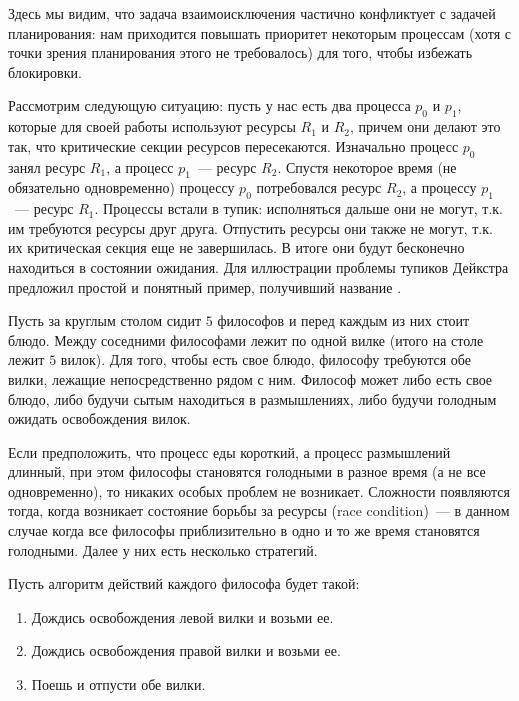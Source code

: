 Здесь мы видим, что задача взаимоисключения частично конфликтует с задачей
планирования: нам приходится повышать приоритет некоторым процессам (хотя с
точки зрения планирования этого не требовалось) для того, чтобы избежать
блокировки.


Рассмотрим следующую ситуацию: пусть у нас есть два процесса \(p_0\) и \(p_1\),
которые для своей работы используют ресурсы \(R_1\) и \(R_2\), причем они делают
это так, что критические секции ресурсов пересекаются. Изначально процесс
\(p_0\) занял ресурс \(R_1\), а процесс \(p_1\)~--- ресурс \(R_2\). Спустя
некоторое время (не обязательно одновременно) процессу \(p_0\) потребовался
ресурс \(R_2\), а процессу \(p_1\)~--- ресурс \(R_1\). Процессы встали в тупик:
исполняться дальше они не могут, т.к. им требуются ресурсы друг друга. Отпустить
ресурсы они также не могут, т.к. их критическая секция еще не завершилась. В
итоге они будут бесконечно находиться в состоянии ожидания. Для иллюстрации
проблемы тупиков Дейкстра предложил простой и понятный пример, получивший
название .

Пусть за круглым столом сидит \(5\) философов и перед каждым из них стоит блюдо.
Между соседними философами лежит по одной вилке (итого на столе лежит \(5\)
вилок). Для того, чтобы есть свое блюдо, философу требуются обе вилки, лежащие
непосредственно рядом с ним. Философ может либо есть свое блюдо, либо будучи
сытым находиться в размышлениях, либо будучи голодным ожидать освобождения
вилок.

Если предположить, что процесс еды короткий, а процесс размышлений длинный, при
этом философы становятся голодными в разное время (а не все одновременно), то
никаких особых проблем не возникает. Сложности появляются тогда, когда возникает
состояние борьбы за ресурсы (race condition)~--- в данном случае когда все
философы приблизительно в одно и то же время становятся голодными. Далее у них
есть несколько стратегий.


Пусть алгоритм действий каждого философа будет такой:

\begin{enumerate}
\item
  Дождись освобождения левой вилки и возьми ее.

\item
  Дождись освобождения правой вилки и возьми ее.

\item
  Поешь и отпусти обе вилки.
\end{enumerate}


